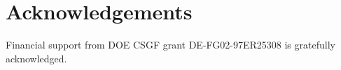 \section*{Acknowledgements}

Financial support from DOE CSGF grant DE-FG02-97ER25308 is gratefully acknowledged.
